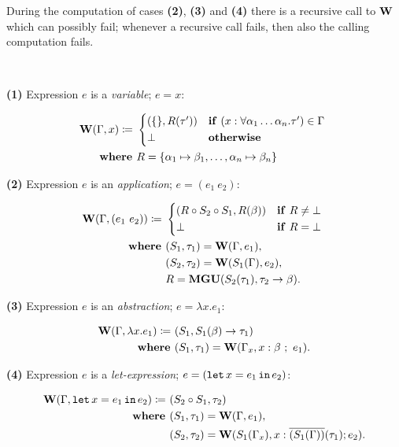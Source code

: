 \documentclass[a4paper,oneside]{memoir}
\begin{document}
During the computation of cases \textbf{(2)}, \textbf{(3)} and \textbf{(4)} there is a recursive call to $\operatorname{\textbf{W}}$ which can possibly fail; whenever a recursive call fails, then also the calling computation fails.

~

\textbf{(1)} Expression $e$ is a \textit{variable}; $e = x$:

\begin{align*}
\W(\Gamma, x) \defi ~ &
\begin{cases*}
  (\{\}, R(\tauPr) ) 
  & \textbf{if} $(x : \forall \alpha_1 \dots \alpha_n.\tauPr) \in \Gamma$  \\
  \bot & \textbf{otherwise}
\end{cases*}\\
\where & R = \{\alpha_1 \mapsto \beta_1, \dots, \alpha_n \mapsto \beta_n\} \\
\end{align*}


\textbf{(2)} Expression $e$ is an \textit{application}; $e = (e_1~e_2)$:

\begin{align*}
\W(\Gamma, (e_1~e_2)) \defi ~ & 
\begin{cases*}
  (R \circ S_2 \circ S_1, R(\beta) ) & \textbf{if} $R \neq \bot$ \\
  \bot & \textbf{if} $R = \bot$
\end{cases*}\\
\where & (S_1, \tau_1) = \W(\Gamma, e_1), \\
       & (S_2, \tau_2) = \W(S_1(\Gamma), e_2), \\
       & R = \Mgu( S_2(\tau_1), \tau_2 \ar \beta ).\\
\end{align*}


\textbf{(3)} Expression $e$ is an \textit{abstraction}; $e = \lambda x . e_1$:

\begin{align*}
\operatorname{\textbf{W}}(\Gamma, \lambda x .e_1) \coloneqq ~ & (S_1, S_1(\beta) \rightarrow \tau_1 ) \\
\operatorname{\textbf{where~}} & (S_1, \tau_1) = \operatorname{\textbf{W}}(\Gamma_x, x : \beta ~;~ e_1). \\
\end{align*}



\textbf{(4)} Expression $e$ is a \textit{let-expression}; $e = (\texttt{let} \, x = e_1 \, \texttt{in} \, e_2)$:

\begin{align*}
\operatorname{\textbf{W}}(\Gamma, \texttt{let} \, x = e_1 \, \texttt{in} \, e_2) \coloneqq ~ & (S_2 \circ S_1, \tau_2) \\
\operatorname{\textbf{where~}} & (S_1, \tau_1) = \operatorname{\textbf{W}}(\Gamma, e_1), \\
       & (S_2, \tau_2) = \operatorname{\textbf{W}}(S_1(\Gamma_x),x:\overline{(S_1(\Gamma))}(\tau_1); e_2). \\
\end{align*}
\end{document}

